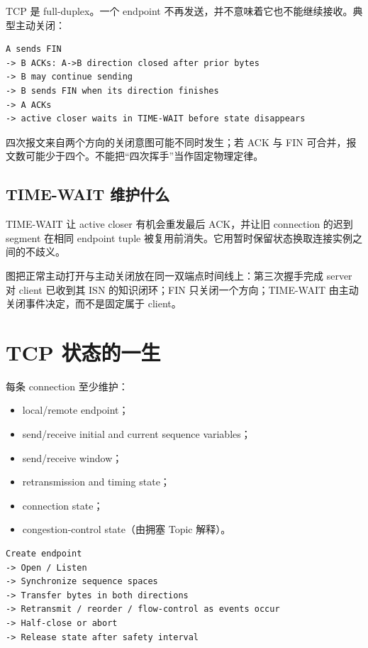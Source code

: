 \documentclass[UTF8,fontset=none,11pt,a4paper]{ctexart}
\providecommand{\tightlist}{\setlength{\itemsep}{0pt}\setlength{\parskip}{0pt}}
\begin{document}
TCP 是 full-duplex。一个 endpoint
不再发送，并不意味着它也不能继续接收。典型主动关闭：

\begin{lstlisting}
A sends FIN
-> B ACKs: A->B direction closed after prior bytes
-> B may continue sending
-> B sends FIN when its direction finishes
-> A ACKs
-> active closer waits in TIME-WAIT before state disappears
\end{lstlisting}

四次报文来自两个方向的关闭意图可能不同时发生；若 ACK 与 FIN
可合并，报文数可能少于四个。不能把``四次挥手''当作固定物理定律。

\subsection{TIME-WAIT
维护什么}\label{91-time-wait-ux7ef4ux62a4ux4ec0ux4e48}

TIME-WAIT 让 active closer 有机会重发最后 ACK，并让旧 connection 的迟到
segment 在相同 endpoint tuple
被复用前消失。它用暂时保留状态换取连接实例之间的不歧义。

\begin{center}
\resizebox{0.96\linewidth}{!}{}
\end{center}
图把正常主动打开与主动关闭放在同一双端点时间线上：第三次握手完成 server 对 client 已收到其 ISN 的知识闭环；FIN 只关闭一个方向；TIME-WAIT 由主动关闭事件决定，而不是固定属于 client。

\section{TCP
状态的一生}\label{10-tcp-ux72b6ux6001ux7684ux4e00ux751f}

每条 connection 至少维护：

\begin{itemize}
\tightlist
\item
  local/remote endpoint；
\item
  send/receive initial and current sequence variables；
\item
  send/receive window；
\item
  retransmission and timing state；
\item
  connection state；
\item
  congestion-control state（由拥塞 Topic 解释）。
\end{itemize}

\begin{lstlisting}
Create endpoint
-> Open / Listen
-> Synchronize sequence spaces
-> Transfer bytes in both directions
-> Retransmit / reorder / flow-control as events occur
-> Half-close or abort
-> Release state after safety interval
\end{lstlisting}
\end{document}
